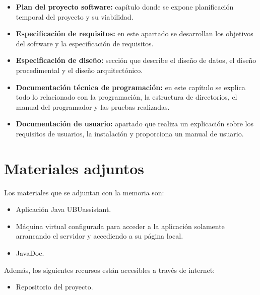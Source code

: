 \begin{itemize}
\tightlist
\item
  \textbf{Plan del proyecto software:} capítulo donde se expone planificación temporal del proyecto y su viabilidad.
\item
  \textbf{Especificación de requisitos:} en este apartado se desarrollan los objetivos del software y la especificación de requisitos.
\item
  \textbf{Especificación de diseño:} sección que describe el diseño de datos, el diseño procedimental y el diseño arquitectónico.
\item
  \textbf{Documentación técnica de programación:} en este capítulo se explica todo lo relacionado con la programación, la estructura de directorios, el manual del programador y las pruebas realizadas.
\item
  \textbf{Documentación de usuario:} apartado que realiza un explicación sobre los requisitos de usuarios, la instalación y proporciona un manual de usuario.
\end{itemize}

\section{Materiales adjuntos}\label{materiales-adjuntos}

Los materiales que se adjuntan con la memoria son: 

\begin{itemize}
\tightlist
\item
	Aplicación Java UBUassistant.
\item
	Máquina virtual configurada para acceder a la aplicación solamente arrancando el servidor y accediendo a su página local.
\item	
	JavaDoc.
\end{itemize}

Además, los siguientes recursos están accesibles a través de internet:

\begin{itemize}
\tightlist
\item
  Repositorio del proyecto. \cite{ubuassistant:repo}
\end{itemize}

